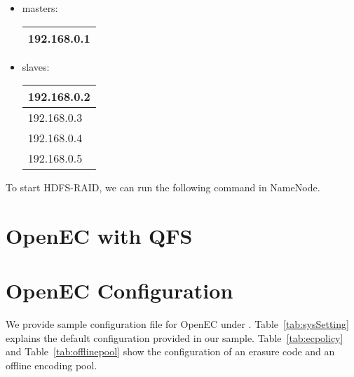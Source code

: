\documentclass[letterpaper,12pt]{article}
\newcommand{\openec}{{\sf\small OpenEC}\xspace}
\begin{document}
\begin{itemize}
\item masters:

\begin{center}
\renewcommand{\arraystretch}{1.1}
\begin{tabular}{|l|}
\hline
192.168.0.1 \\
\hline
\end{tabular}
\vspace{-3pt}
\end{center}

\item slaves:

\begin{center}
\renewcommand{\arraystretch}{1.1}
\begin{tabular}{|l|}
\hline
192.168.0.2 \\
\hline
192.168.0.3 \\
\hline
192.168.0.4 \\
\hline
192.168.0.5 \\
\hline
\end{tabular}
\vspace{-3pt}
\end{center}

\end{itemize}

To start HDFS-RAID, we can run the following command in NameNode.

\begin{center}
\noindent{}
\end{center}

\section{OpenEC with QFS}
\label{sec:qfs}

\section{OpenEC Configuration}

We provide sample configuration file for \openec under .
Table~\ref{tab:sysSetting} explains the default configuration provided in our sample.
Table~\ref{tab:ecpolicy} and Table~\ref{tab:offlinepool} show the configuration of an
erasure code and an offline encoding pool.
\end{document}

